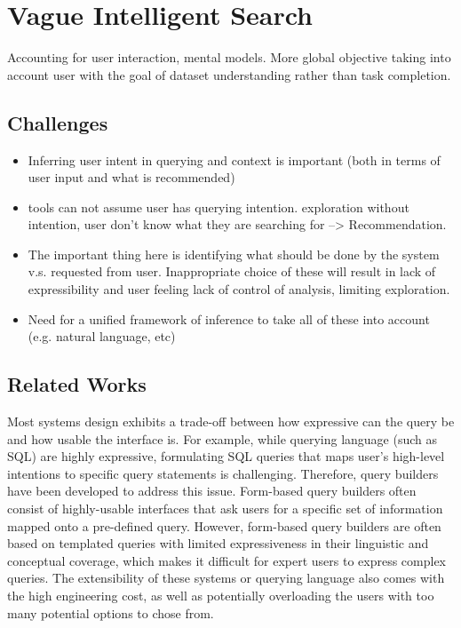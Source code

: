 \section{Vague Intelligent Search\label{sec:vague}}
Accounting for user interaction, mental models. More global objective taking into account user with the goal of dataset understanding rather than task completion.

\subsection{Challenges}
\begin{itemize}
\item Inferring user intent in querying and context is important (both in terms of user input and what is recommended)
\item tools can not assume user has querying intention. exploration without intention, user don’t know what they are searching for --> Recommendation.
\item The important thing here is identifying what should be done by the system v.s. requested from user. Inappropriate choice of these will result in lack of expressibility and user feeling lack of control of analysis, limiting exploration.
\item Need for a unified framework of inference to take all of these into account (e.g. natural language, etc)
\end{itemize}
\subsection{Related Works}

Most systems design exhibits a trade-off between how expressive can the query be and how usable the interface is. For example, while querying language (such as SQL) are highly expressive, formulating SQL queries that maps user's high-level intentions to specific query statements is challenging. Therefore, query builders have been developed to address this issue. Form-based query builders often consist of highly-usable interfaces that ask users for a specific set of information mapped onto a pre-defined query. However, form-based query builders are often based on templated queries with limited expressiveness in their linguistic and conceptual coverage, which makes it difficult for expert users to express complex queries. The extensibility of these systems or querying language also comes with the high engineering cost, as well as potentially overloading the users with too many potential options to chose from.

